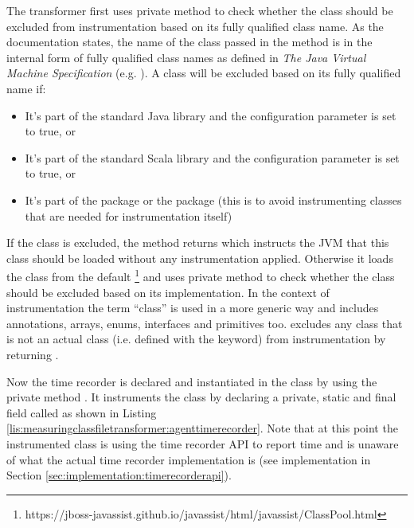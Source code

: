 \noindent The transformer first uses private method  to check whether the class should be excluded from instrumentation based on its fully qualified class name. As the documentation states, the name of the class passed in the method is in the internal form of fully qualified class names as defined in \textit{The Java Virtual Machine Specification} (e.g. ). A class will be excluded based on its fully qualified name if:
\begin{itemize}
  \item It's part of the standard Java library and the  configuration parameter is set to true, or
  \item It's part of the standard Scala library and the  configuration parameter is set to true, or
  \item It's part of the  package or the  package (this is to avoid instrumenting classes that are needed for instrumentation itself)
\end{itemize}

\noindent If the class is excluded, the method returns  which instructs the JVM that this class should be loaded without any instrumentation applied. Otherwise it loads the class from the default \footnote{https://jboss-javassist.github.io/javassist/html/javassist/ClassPool.html} and uses private method  to check whether the class should be excluded based on its implementation. In the context of instrumentation the term \enquote{class} is used in a more generic way and includes annotations, arrays, enums, interfaces and primitives too.  excludes any class that is not an actual class (i.e. defined with the  keyword) from instrumentation by returning .

\noindent Now the time recorder is declared and instantiated in the class by using the private method . It instruments the class by declaring a private, static and final field called  as shown in Listing \ref{lis:measuringclassfiletransformer:agenttimerecorder}. Note that at this point the instrumented class is using the time recorder API to report time and is unaware of what the actual time recorder implementation is (see implementation in Section \ref{sec:implementation:timerecorderapi}).

